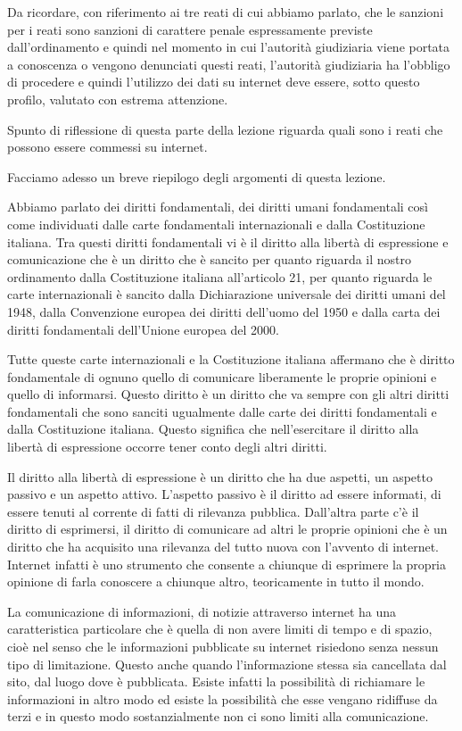 Da ricordare, con riferimento ai tre reati di cui abbiamo parlato, che le sanzioni per i reati sono sanzioni di carattere penale espressamente previste dall'ordinamento e quindi nel momento in cui l'autorità giudiziaria viene portata a conoscenza o vengono denunciati questi reati, l'autorità giudiziaria ha l'obbligo di procedere e quindi l'utilizzo dei dati su internet deve essere, sotto questo profilo, valutato con estrema attenzione. \par
Spunto di riflessione di questa parte della lezione riguarda quali sono i reati che possono essere commessi su internet. \par
Facciamo adesso un breve riepilogo degli argomenti di questa lezione.\par 
Abbiamo parlato dei diritti fondamentali, dei diritti umani fondamentali così come individuati dalle carte fondamentali internazionali e dalla Costituzione italiana. Tra questi diritti fondamentali vi è il diritto alla libertà di espressione e comunicazione che è un diritto che è sancito per quanto riguarda il nostro ordinamento dalla Costituzione italiana all'articolo 21, per quanto riguarda le carte internazionali è sancito dalla Dichiarazione universale dei diritti umani del 1948, dalla Convenzione europea dei diritti dell'uomo del 1950 e dalla carta dei diritti fondamentali dell'Unione europea del 2000.\par
Tutte queste carte internazionali e la Costituzione italiana affermano che è diritto fondamentale di ognuno quello di comunicare liberamente le proprie opinioni e quello di informarsi. Questo diritto è un diritto che va sempre con gli altri diritti fondamentali che sono sanciti ugualmente dalle carte dei diritti fondamentali e dalla Costituzione italiana. Questo significa che nell'esercitare il diritto alla libertà di espressione occorre tener conto degli altri diritti.\par
Il diritto alla libertà di espressione è un diritto che ha due aspetti, un aspetto passivo e un aspetto attivo. L'aspetto passivo è il diritto ad essere informati, di essere tenuti al corrente di fatti di rilevanza pubblica. Dall'altra parte c'è il diritto di esprimersi, il diritto di comunicare ad altri le proprie opinioni che è un diritto che ha acquisito una rilevanza del tutto nuova con l'avvento di internet. Internet infatti è uno strumento che consente a chiunque di esprimere la propria opinione di farla conoscere a chiunque altro, teoricamente in tutto il mondo.\par 
La comunicazione di informazioni, di notizie attraverso internet ha una caratteristica particolare che è quella di non avere limiti di tempo e di spazio, cioè nel senso che le informazioni pubblicate su internet risiedono senza nessun tipo di limitazione. Questo anche quando l'informazione stessa sia cancellata dal sito, dal luogo dove è pubblicata. Esiste infatti la possibilità di richiamare le informazioni in altro modo ed esiste la possibilità che esse vengano ridiffuse da terzi e in questo modo sostanzialmente non ci sono limiti alla comunicazione.\par 
